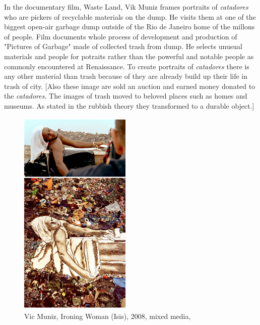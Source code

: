 In the documentary film, Waste Land, Vik Muniz frames portraits of \textit{catadores} who are pickers of recyclable materials on the dump. He visits them at one of the biggest open-air garbage dump outside of the Rio de Janeiro home of the millons of people. Film documents whole process of development and production of "Pictures of Garbage" made of collected trash from dump. He selects unusual materials and people for potraits rather than the powerful and notable people as commonly encountered at Renaissance. To create portraits of \textit{catadores} there is any other material than trash because of they are already build up their life in trash of city. [Also these image are sold an auction and earned money donated to the \textit{catadores}. The images of trash moved to beloved places such as homes and museums. As stated in the rubbish theory they transformed to a durable object.]

\begin{figure}[h!]
  \centering
  \includegraphics[height=10cm]{graphics/vik-muniz-picturesofgarbage0.jpg}
  \caption{Vic Muniz, Ironing Woman (Isis), 2008, mixed media, }
  \label{fig:VicMuniz_PicturesOfGarbage}
\end{figure}

